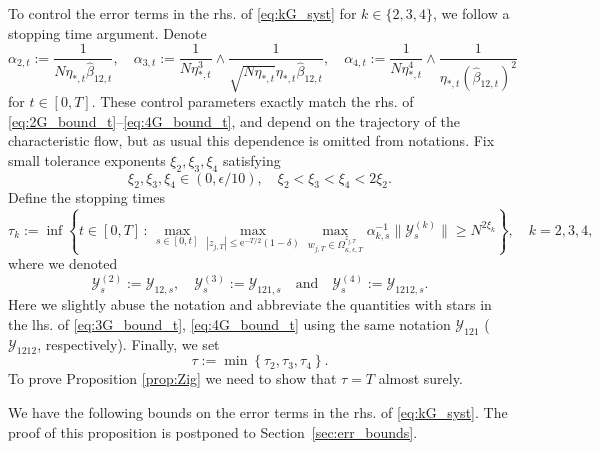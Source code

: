 \documentclass[10pt]{amsart}
\numberwithin{equation}{section}
\newcommand{\ee}{\mathrm{e}}
\begin{document}
To control the error terms in the rhs. of \eqref{eq:kG_syst} for $k\in\{2,3,4\}$, we follow a stopping time argument. Denote
\begin{equation}
\alpha_{2,t}:=\frac{1}{N\eta_{*,t}\widehat{\beta}_{12,t}},\quad \alpha_{3,t}:=\frac{1}{N\eta^3_{*,t}}\wedge \frac{1}{\sqrt{N\eta_{*,t}}\eta_{*,t}\widehat{\beta}_{12,t}},\quad \alpha_{4,t}:=\frac{1}{N\eta^4_{*,t}}\wedge \frac{1}{\eta_{*,t}(\widehat{\beta}_{12,t})^2}
\label{eq:def_alpha}
\end{equation} 
for $t\in [0,T]$. These control parameters exactly match the rhs. of \eqref{eq:2G_bound_t}--\eqref{eq:4G_bound_t}, and depend on the trajectory of the characteristic flow, but as usual this dependence is omitted from notations. Fix small tolerance exponents $\xi_2,\xi_3,\xi_4$ satisfying
\begin{equation}
\xi_2,\xi_3,\xi_4\in (0,\epsilon/10),\quad \xi_2<\xi_3<\xi_4<2\xi_2.
\label{eq:tolerance_exp}
\end{equation}
Define the stopping times
\begin{equation}
\tau_k:= \inf\left\lbrace t\in [0,T]\,:\, \max_{s\in [0,t]}\max_{|z_{j,T}|\le \ee^{-T/2}(1-\delta)}\max_{w_{j,T}\in\Omega_{\kappa,\epsilon,T}^{z_{j,T}}} \alpha_{k,s}^{-1}\|\mathcal{Y}^{(k)}_s\|\ge N^{2\xi_k}\right\rbrace,\quad k=2,3,4,
\label{eq:def_tau_k}
\end{equation}
where we denoted
\begin{equation}
\mathcal{Y}^{(2)}_s:=\mathcal{Y}_{12,s},\quad \mathcal{Y}^{(3)}_s:=\mathcal{Y}_{121,s}\quad \text{and}\quad \mathcal{Y}^{(4)}_s:=\mathcal{Y}_{1212,s}.
\label{eq:Y_short}
\end{equation}
Here we slightly abuse the notation and abbreviate the quantities with stars in the lhs. of \eqref{eq:3G_bound_t}, \eqref{eq:4G_bound_t} using the same notation $\mathcal{Y}_{121}$ ($\mathcal{Y}_{1212}$, respectively). Finally, we set
\begin{equation}
\tau:=\min\left\lbrace \tau_2,\tau_3,\tau_4\right\rbrace.
\end{equation}
To prove Proposition \ref{prop:Zig} we need to show that $\tau=T$ almost surely.


We have the following bounds on the error terms in the rhs. of \eqref{eq:kG_syst}. The proof of this proposition is postponed to Section~\ref{sec:err_bounds}.
\end{document}
